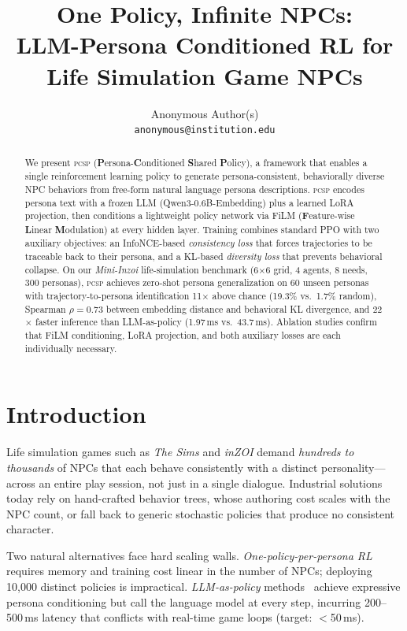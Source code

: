 \documentclass{article}
\title{\textbf{One Policy, Infinite NPCs:}\\
LLM-Persona Conditioned RL for Life Simulation Game NPCs}
\author{
  Anonymous Author(s)\\
  \texttt{anonymous@institution.edu}
}
\date{}
\newcommand{\PCSP}{\textsc{pcsp}}
\begin{document}
\maketitle

\begin{abstract}
We present \PCSP{} (\textbf{P}ersona-\textbf{C}onditioned \textbf{S}hared \textbf{P}olicy),
a framework that enables a single reinforcement learning policy to generate
persona-consistent, behaviorally diverse NPC behaviors from free-form natural
language persona descriptions.
\PCSP{} encodes persona text with a frozen LLM (Qwen3-0.6B-Embedding) plus a
learned LoRA projection, then conditions a lightweight policy network via
FiLM (\textbf{F}eature-wise \textbf{L}inear \textbf{M}odulation) at every hidden
layer.
Training combines standard PPO with two auxiliary objectives: an InfoNCE-based
\textit{consistency loss} that forces trajectories to be traceable back to their
persona, and a KL-based \textit{diversity loss} that prevents behavioral collapse.
On our \textit{Mini-Inzoi} life-simulation benchmark (6$\times$6 grid, 4 agents,
8 needs, 300 personas),
\PCSP{} achieves zero-shot persona generalization on 60 unseen personas
with trajectory-to-persona identification 11$\times$ above chance
(19.3\% vs.\ 1.7\% random),
Spearman $\rho\!=\!0.73$ between embedding distance and behavioral KL divergence,
and 22$\times$ faster inference than LLM-as-policy (1.97\,ms vs.\ 43.7\,ms).
Ablation studies confirm that FiLM conditioning, LoRA projection, and both
auxiliary losses are each individually necessary.
\end{abstract}

\section{Introduction}
\label{sec:intro}

Life simulation games such as \textit{The Sims} and \textit{inZOI} demand
\emph{hundreds to thousands} of NPCs that each behave consistently with a
distinct personality---across an entire play session, not just in a single
dialogue.
Industrial solutions today rely on hand-crafted behavior trees, whose authoring
cost scales with the NPC count, or fall back to generic stochastic policies
that produce no consistent character.

Two natural alternatives face hard scaling walls.
\emph{One-policy-per-persona RL} requires memory and training cost linear in the
number of NPCs; deploying 10{,}000 distinct policies is impractical.
\emph{LLM-as-policy} methods~\citep{ahn2022saycan,wang2023voyager} achieve
expressive persona conditioning but call the language model at every step,
incurring 200--500\,ms latency that conflicts with real-time game loops (target:
$<$50\,ms).
\end{document}
